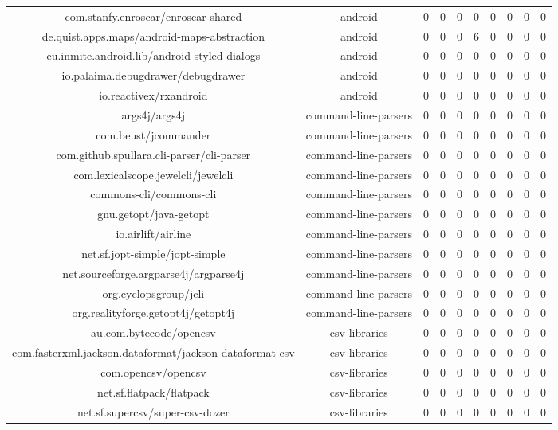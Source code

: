 \begin{center}
{\begin{tabular}{|c|c|c|c|c|c|c|c|c|c|}
com.stanfy.enroscar/enroscar-shared & android & 0 & 0 & 0 & 0 & 0 & 0 & 0 & 0 \\
de.quist.apps.maps/android-maps-abstraction & android & 0 & 0 & 0 & 6 & 0 & 0 & 0 & 0 \\
eu.inmite.android.lib/android-styled-dialogs & android & 0 & 0 & 0 & 0 & 0 & 0 & 0 & 0 \\
io.palaima.debugdrawer/debugdrawer & android & 0 & 0 & 0 & 0 & 0 & 0 & 0 & 0 \\
io.reactivex/rxandroid & android & 0 & 0 & 0 & 0 & 0 & 0 & 0 & 0 \\
args4j/args4j & command-line-parsers & 0 & 0 & 0 & 0 & 0 & 0 & 0 & 0 \\
com.beust/jcommander & command-line-parsers & 0 & 0 & 0 & 0 & 0 & 0 & 0 & 0 \\
com.github.spullara.cli-parser/cli-parser & command-line-parsers & 0 & 0 & 0 & 0 & 0 & 0 & 0 & 0 \\
com.lexicalscope.jewelcli/jewelcli & command-line-parsers & 0 & 0 & 0 & 0 & 0 & 0 & 0 & 0 \\
commons-cli/commons-cli & command-line-parsers & 0 & 0 & 0 & 0 & 0 & 0 & 0 & 0 \\
gnu.getopt/java-getopt & command-line-parsers & 0 & 0 & 0 & 0 & 0 & 0 & 0 & 0 \\
io.airlift/airline & command-line-parsers & 0 & 0 & 0 & 0 & 0 & 0 & 0 & 0 \\
net.sf.jopt-simple/jopt-simple & command-line-parsers & 0 & 0 & 0 & 0 & 0 & 0 & 0 & 0 \\
net.sourceforge.argparse4j/argparse4j & command-line-parsers & 0 & 0 & 0 & 0 & 0 & 0 & 0 & 0 \\
org.cyclopsgroup/jcli & command-line-parsers & 0 & 0 & 0 & 0 & 0 & 0 & 0 & 0 \\
org.realityforge.getopt4j/getopt4j & command-line-parsers & 0 & 0 & 0 & 0 & 0 & 0 & 0 & 0 \\
au.com.bytecode/opencsv & csv-libraries & 0 & 0 & 0 & 0 & 0 & 0 & 0 & 0 \\
com.fasterxml.jackson.dataformat/jackson-dataformat-csv & csv-libraries & 0 & 0 & 0 & 0 & 0 & 0 & 0 & 0 \\
com.opencsv/opencsv & csv-libraries & 0 & 0 & 0 & 0 & 0 & 0 & 0 & 0 \\
net.sf.flatpack/flatpack & csv-libraries & 0 & 0 & 0 & 0 & 0 & 0 & 0 & 0 \\
net.sf.supercsv/super-csv-dozer & csv-libraries & 0 & 0 & 0 & 0 & 0 & 0 & 0 & 0 \\

\end{tabular}}
\end{center}
